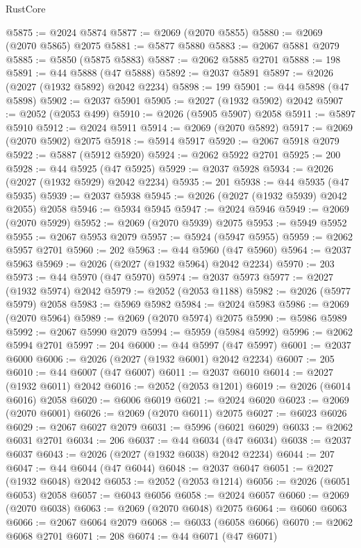 \begin{lexlean}{RustCore}
\begin{coremodule}
@5875 := @2024 @5874
@5877 := @2069 (@2070 @5855)
@5880 := @2069 (@2070 @5865) @2075
@5881 := @5877 @5880
@5883 := @2067 @5881 @2079
@5885 := @5850 (@5875 @5883)
@5887 := @2062 @5885 @2701
@5888 := 198
@5891 := @44 @5888 (@47 @5888)
@5892 := @2037 @5891
@5897 := @2026 (@2027 (@1932 @5892) @2042 @2234)
@5898 := 199
@5901 := @44 @5898 (@47 @5898)
@5902 := @2037 @5901
@5905 := @2027 (@1932 @5902) @2042
@5907 := @2052 (@2053 @499)
@5910 := @2026 (@5905 @5907) @2058
@5911 := @5897 @5910
@5912 := @2024 @5911
@5914 := @2069 (@2070 @5892)
@5917 := @2069 (@2070 @5902) @2075
@5918 := @5914 @5917
@5920 := @2067 @5918 @2079
@5922 := @5887 (@5912 @5920)
@5924 := @2062 @5922 @2701
@5925 := 200
@5928 := @44 @5925 (@47 @5925)
@5929 := @2037 @5928
@5934 := @2026 (@2027 (@1932 @5929) @2042 @2234)
@5935 := 201
@5938 := @44 @5935 (@47 @5935)
@5939 := @2037 @5938
@5945 := @2026 (@2027 (@1932 @5939) @2042 @2055) @2058
@5946 := @5934 @5945
@5947 := @2024 @5946
@5949 := @2069 (@2070 @5929)
@5952 := @2069 (@2070 @5939) @2075
@5953 := @5949 @5952
@5955 := @2067 @5953 @2079
@5957 := @5924 (@5947 @5955)
@5959 := @2062 @5957 @2701
@5960 := 202
@5963 := @44 @5960 (@47 @5960)
@5964 := @2037 @5963
@5969 := @2026 (@2027 (@1932 @5964) @2042 @2234)
@5970 := 203
@5973 := @44 @5970 (@47 @5970)
@5974 := @2037 @5973
@5977 := @2027 (@1932 @5974) @2042
@5979 := @2052 (@2053 @1188)
@5982 := @2026 (@5977 @5979) @2058
@5983 := @5969 @5982
@5984 := @2024 @5983
@5986 := @2069 (@2070 @5964)
@5989 := @2069 (@2070 @5974) @2075
@5990 := @5986 @5989
@5992 := @2067 @5990 @2079
@5994 := @5959 (@5984 @5992)
@5996 := @2062 @5994 @2701
@5997 := 204
@6000 := @44 @5997 (@47 @5997)
@6001 := @2037 @6000
@6006 := @2026 (@2027 (@1932 @6001) @2042 @2234)
@6007 := 205
@6010 := @44 @6007 (@47 @6007)
@6011 := @2037 @6010
@6014 := @2027 (@1932 @6011) @2042
@6016 := @2052 (@2053 @1201)
@6019 := @2026 (@6014 @6016) @2058
@6020 := @6006 @6019
@6021 := @2024 @6020
@6023 := @2069 (@2070 @6001)
@6026 := @2069 (@2070 @6011) @2075
@6027 := @6023 @6026
@6029 := @2067 @6027 @2079
@6031 := @5996 (@6021 @6029)
@6033 := @2062 @6031 @2701
@6034 := 206
@6037 := @44 @6034 (@47 @6034)
@6038 := @2037 @6037
@6043 := @2026 (@2027 (@1932 @6038) @2042 @2234)
@6044 := 207
@6047 := @44 @6044 (@47 @6044)
@6048 := @2037 @6047
@6051 := @2027 (@1932 @6048) @2042
@6053 := @2052 (@2053 @1214)
@6056 := @2026 (@6051 @6053) @2058
@6057 := @6043 @6056
@6058 := @2024 @6057
@6060 := @2069 (@2070 @6038)
@6063 := @2069 (@2070 @6048) @2075
@6064 := @6060 @6063
@6066 := @2067 @6064 @2079
@6068 := @6033 (@6058 @6066)
@6070 := @2062 @6068 @2701
@6071 := 208
@6074 := @44 @6071 (@47 @6071)

\end{coremodule}
\end{lexlean}

